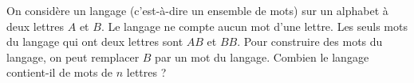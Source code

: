 On considère un langage (c'est-à-dire un ensemble de mots) sur un alphabet à deux lettres $A$ et $B$. Le langage ne compte aucun mot d'une lettre. Les seuls mots du langage qui ont deux lettres sont $AB$ et $BB$. Pour construire des mots du langage, on peut remplacer $B$ par un mot du langage. Combien le langage contient-il de mots de $n$ lettres ?
